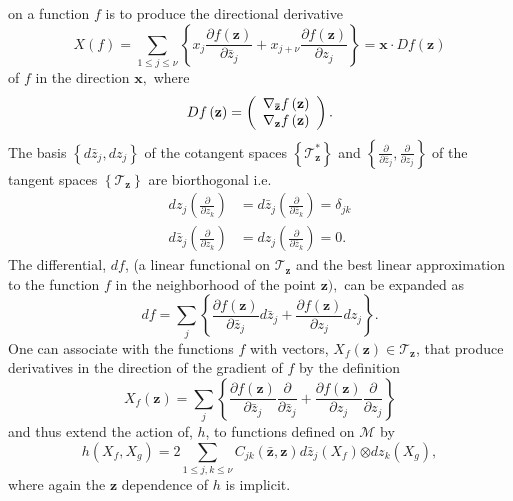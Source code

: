 \documentclass[aps,preprint]{revtex4}%
\begin{document}
on a function $f$ is to produce the directional derivative
\begin{equation}
X\left(  f\right)  =\sum_{1\leq j\leq\nu}\left\{  x_{j}\frac{\partial f\left(
\mathbf{z}\right)  }{\partial\bar{z}_{j}}+x_{j+\nu}\frac{\partial f\left(
\mathbf{z}\right)  }{\partial z_{j}}\right\}  =\mathbf{x\cdot}Df\left(
\mathbf{z}\right)
\end{equation}
of $f$ in the direction $\mathbf{x,}$ where
\begin{equation}
Df\left(  \mathbf{z}\right)  =\left(
\begin{array}
[c]{c}%
\nabla_{\mathbf{\bar{z}}}f\left(  \mathbf{z}\right) \\
\nabla_{\mathbf{z}}f\left(  \mathbf{z}\right)
\end{array}
\right)  .
\end{equation}
The basis $\left\{  d\bar{z}_{j},dz_{j}\right\}  $ of the cotangent spaces
$\left\{  \mathcal{T}_{\mathbf{z}}^{\ast}\right\}  $ and $\left\{
\frac{\partial}{\partial\bar{z}_{j}},\frac{\partial}{\partial z_{j}}\right\}
$ of the tangent spaces $\left\{  \mathcal{T}_{\mathbf{z}}\right\}  $ are
biorthogonal i.e.
\begin{align}
dz_{j}\left(  \frac{\partial}{\partial z_{k}}\right)   &  =d\bar{z}_{j}\left(
\frac{\partial}{\partial\bar{z}_{k}}\right)  =\delta_{jk}\nonumber\\
d\bar{z}_{j}\left(  \frac{\partial}{\partial z_{k}}\right)   &  =dz_{j}\left(
\frac{\partial}{\partial\bar{z}_{k}}\right)  =0.
\end{align}
The differential, $df$, (a linear functional on $\mathcal{T}_{\mathbf{z}}$ and
the best linear approximation to the function $f$ in the neighborhood of the
point $\mathbf{z),}$ can be expanded as
\begin{equation}
df=\sum_{j}\left\{  \frac{\partial f\left(  \mathbf{z}\right)  }{\partial
\bar{z}_{j}}d\bar{z}_{j}+\frac{\partial f\left(  \mathbf{z}\right)  }{\partial
z_{j}}dz_{j}\right\}  .
\end{equation}
One can associate with the functions $f$ with vectors, $X_{f}\left(
\mathbf{z}\right)  \in\mathcal{T}_{\mathbf{z}}$, that produce derivatives in
the direction of the gradient of $f$ by the definition
\begin{equation}
X_{f}\left(  \mathbf{z}\right)  =\sum_{j}\left\{  \frac{\partial f\left(
\mathbf{z}\right)  }{\partial\bar{z}_{j}}\frac{\partial}{\partial\bar{z}_{j}%
}+\frac{\partial f\left(  \mathbf{z}\right)  }{\partial z_{j}}\frac{\partial
}{\partial z_{j}}\right\}
\end{equation}
and thus extend the action of, $h$, to functions defined on $\mathcal{M}$ by
\begin{equation}
h\left(  X_{f},X_{g}\right)  =2\sum_{1\leq j,k\leq\nu}C_{jk}\left(
\mathbf{\bar{z},z}\right)  d\bar{z}_{j}\left(  X_{f}\right)  \mathbf{\otimes
}dz_{k}\left(  X_{g}\right)  ,
\end{equation}
where again the $\mathbf{z}$ dependence of $h$ is implicit.
\end{document}
